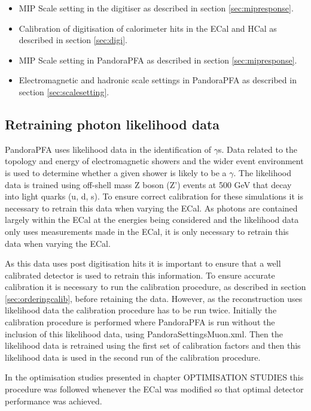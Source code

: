 \begin{itemize}
\item MIP Scale setting in the digitiser as described in section \ref{sec:mipresponse}.
\item Calibration of digitisation of calorimeter hits in the ECal and HCal as described in section \ref{sec:digi}.
\item MIP Scale setting in PandoraPFA as described in section \ref{sec:mipresponse}.
\item Electromagnetic and hadronic scale settings in PandoraPFA as described in section \ref{sec:scalesetting}.
\end{itemize}


\subsection{Retraining photon likelihood data}
PandoraPFA uses likelihood data in the identification of $\gamma$s.  Data related to the topology and energy of electromagnetic showers and the wider event environment is used to determine whether a given shower is likely to be a $\gamma$.  The likelihood data is trained using off-shell mass Z boson (Z') events at 500 GeV that decay into light quarks (u, d, s).  To ensure correct calibration for these simulations it is necessary to retrain this data when varying the ECal.  As photons are contained largely within the ECal at the energies being considered and the likelihood data only uses measurements made in the ECal, it is only necessary to retrain this data when varying the ECal.  

As this data uses post digitisation hits it is important to ensure that a well calibrated detector is used to retrain this information.  To ensure accurate calibration it is necessary to run the calibration procedure, as described in section \ref{sec:orderingcalib}, before retaining the data.  However, as the reconstruction uses likelihood data the calibration procedure has to be run twice.  Initially the calibration procedure is performed where PandoraPFA is run without the inclusion of this likelihood data, using PandoraSettingsMuon.xml.  Then the likelihood data is retrained using the first set of calibration factors and then this likelihood data is used in the second run of the calibration procedure.  

In the optimisation studies presented in chapter OPTIMISATION STUDIES this procedure was followed whenever the ECal was modified so that optimal detector performance was achieved.  

